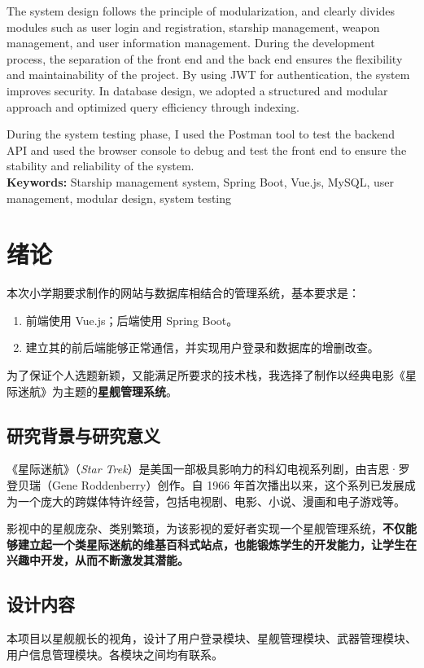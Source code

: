 \documentclass{base}
\begin{document}
The system design follows the principle of modularization, and clearly divides modules such as user login and registration, starship management, weapon management, and user information management. During the development process, the separation of the front end and the back end ensures the flexibility and maintainability of the project. By using JWT for authentication, the system improves security. In database design, we adopted a structured and modular approach and optimized query efficiency through indexing.

During the system testing phase, I used the Postman tool to test the backend API and used the browser console to debug and test the front end to ensure the stability and reliability of the system.
\\

\noindent\textbf{Keywords:} Starship management system, Spring Boot, Vue.js, MySQL, user management, modular design, system testing

\newpage

\section{绪论}

本次小学期要求制作的网站与数据库相结合的管理系统，基本要求是：

\begin{enumerate}
	\item 前端使用 Vue.js；后端使用 Spring Boot。
	\item 建立其的前后端能够正常通信，并实现用户登录和数据库的增删改查。
\end{enumerate}

为了保证个人选题新颖，又能满足所要求的技术栈，我选择了制作以经典电影《星际迷航》为主题的\textbf{星舰管理系统}。
\subsection{研究背景与研究意义}
《星际迷航》（\textit{Star Trek}）是美国一部极具影响力的科幻电视系列剧，由吉恩·罗登贝瑞（Gene Roddenberry）创作。自 1966 年首次播出以来，这个系列已发展成为一个庞大的跨媒体特许经营，包括电视剧、电影、小说、漫画和电子游戏等。

影视中的星舰庞杂、类别繁琐，为该影视的爱好者实现一个星舰管理系统，\textbf{不仅能够建立起一个类星际迷航的维基百科式站点，也能锻炼学生的开发能力，让学生在兴趣中开发，从而不断激发其潜能。}
\subsection{设计内容}
本项目以星舰舰长的视角，设计了用户登录模块、星舰管理模块、武器管理模块、用户信息管理模块。各模块之间均有联系。
\end{document}
